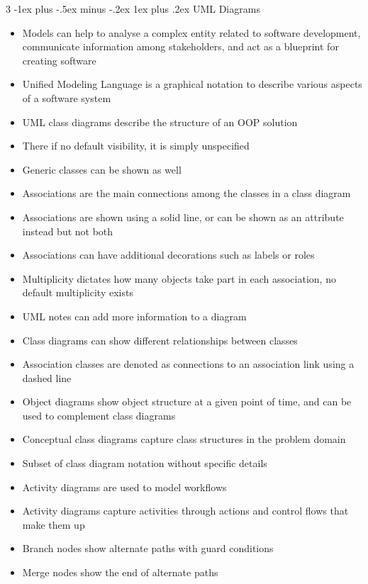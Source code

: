 \documentclass[10pt, landscape]{article}
\makeatletter
\renewcommand{\subsection}{\@startsection{subsection}{3}{0mm}%
                                {-1ex plus -.5ex minus -.2ex}%
                                {1ex plus .2ex}%
                                {\normalfont\small\bfseries}}%
\makeatother
\begin{document}
\begin{multicols*}{3}
\subsection{UML Diagrams}
\begin{itemize}
    \item Models can help to analyse a complex entity related to software development, communicate information among stakeholders, and act as a blueprint for creating software
    \item Unified Modeling Language is a graphical notation to describe various aspects of a software system
    \item UML class diagrams describe the structure of an OOP solution
    \item There if no default visibility, it is simply unspecified
    \item Generic classes can be shown as well
    \item Associations are the main connections among the classes in a class diagram
    \item Associations are shown using a solid line, or can be shown as an attribute instead but not both
    \item Associations can have additional decorations such as labels or roles
    \item Multiplicity dictates how many objects take part in each association, no default multiplicity exists
    \item UML notes can add more information to a diagram
    \item Class diagrams can show different relationships between classes
    \item Association classes are denoted as connections to an association link using a dashed line
    \item Object diagrams show object structure at a given point of time, and can be used to complement class diagrams
    \item Conceptual class diagrams capture class structures in the problem domain
    \item Subset of class diagram notation without specific details
    \item Activity diagrams are used to model workflows
    \item Activity diagrams capture activities through actions and control flows that make them up
    \item Branch nodes show alternate paths with guard conditions
    \item Merge nodes show the end of alternate paths

\end{itemize}
\end{multicols*}
\end{document}
